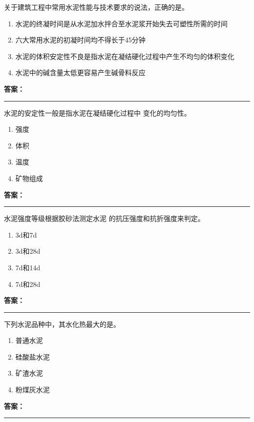 \documentclass[UTF8,fontset=fandol,11pt]{ctexart}
\newcommand{\answerline}{\textcolor{answerred}{\rule{2.4cm}{0.7pt}}}
\begin{document}
\vspace{0.2em}

\begin{quizbox}[title={第 43 题}]
关于建筑工程中常用水泥性能与技术要求的说法，正确的是。\\
\begin{enumerate}[label=\Alph*.]
\item 水泥的终凝时间是从水泥加水拌合至水泥浆开始失去可塑性所需的时间
\item 六大常用水泥的初凝时间均不得长于45分钟
\item 水泥的体积安定性不良是指水泥在凝结硬化过程中产生不均匀的体积变化
\item 水泥中的碱含量太低更容易产生碱骨料反应
\end{enumerate}
\textbf{\textcolor{answerred}{答案：}} \answerline
\end{quizbox}

\vspace{0.2em}

\begin{quizbox}[title={第 44 题}]
水泥的安定性一般是指水泥在凝结硬化过程中 变化的均匀性。\\
\begin{enumerate}[label=\Alph*.]
\item 强度
\item 体积
\item 温度
\item 矿物组成
\end{enumerate}
\textbf{\textcolor{answerred}{答案：}} \answerline
\end{quizbox}

\vspace{0.2em}

\begin{quizbox}[title={第 45 题}]
水泥强度等级根据胶砂法测定水泥 的抗压强度和抗折强度来判定。\\
\begin{enumerate}[label=\Alph*.]
\item 3d和7d
\item 3d和28d
\item 7d和14d
\item 7d和28d
\end{enumerate}
\textbf{\textcolor{answerred}{答案：}} \answerline
\end{quizbox}

\vspace{0.2em}

\begin{quizbox}[title={第 46 题}]
下列水泥品种中，其水化热最大的是。\\
\begin{enumerate}[label=\Alph*.]
\item 普通水泥
\item 硅酸盐水泥
\item 矿渣水泥
\item 粉煤灰水泥
\end{enumerate}
\textbf{\textcolor{answerred}{答案：}} \answerline
\end{quizbox}
\end{document}
